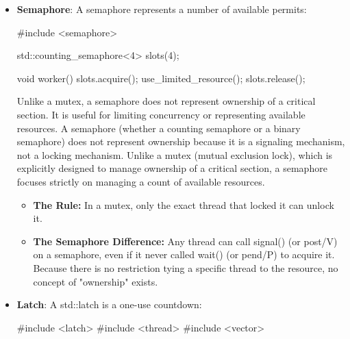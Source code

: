 \documentclass{report}
\begin{document}
\begin{itemize}
\begin{cppcode}
                void initialize()
                {
                    std::call_once(initialization_flag, [] {
                        initialize_library();
                    });
                }
            \end{cppcode}
            \bigbreak \noindent 
            Function-local static initialization is also thread-safe since C++11:
            \bigbreak \noindent 
            \begin{cppcode}
                Resource& resource() {
                    static Resource instance;
                    return instance;
                }
            \end{cppcode}
        \item \textbf{Semaphore}: A semaphore represents a number of available permits:
            \bigbreak \noindent 
            \begin{cppcode}
                #include <semaphore>

                std::counting_semaphore<4> slots(4);

                void worker() {
                    slots.acquire();
                    use_limited_resource();
                    slots.release();
                }
            \end{cppcode}
            \bigbreak \noindent 
            Unlike a mutex, a semaphore does not represent ownership of a critical section. It is useful for limiting concurrency or representing available resources.
            \bigbreak \noindent 
            A semaphore (whether a counting semaphore or a binary semaphore) does not represent ownership because it is a signaling mechanism, not a locking mechanism.
            \bigbreak \noindent 
            Unlike a mutex (mutual exclusion lock), which is explicitly designed to manage ownership of a critical section, a semaphore focuses strictly on managing a count of available resources.
            \begin{itemize}
                \item \textbf{The Rule:} In a mutex, only the exact thread that locked it can unlock it.
                \item \textbf{The Semaphore Difference:} Any thread can call signal() (or post/V) on a semaphore, even if it never called wait() (or pend/P) to acquire it. Because there is no restriction tying a specific thread to the resource, no concept of "ownership" exists.
            \end{itemize}
        \item \textbf{Latch}: A std::latch is a one-use countdown:
            \bigbreak \noindent 
            \begin{cppcode}
                #include <latch>
                #include <thread>
                #include <vector>


\end{cppcode}
\end{itemize}
\end{document}
